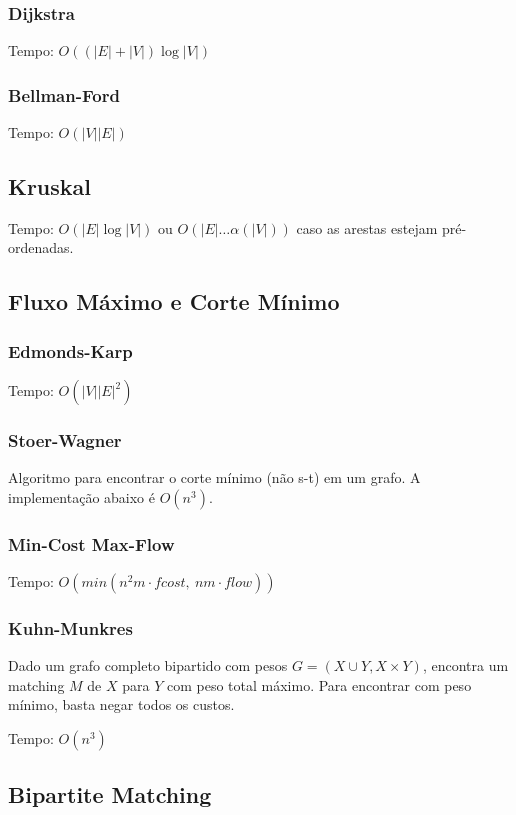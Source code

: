 \documentclass[12pt,a4paper]{article}
\begin{document}
			\subsubsection{Dijkstra}
				Tempo: \( O((|E| + |V|) \log |V|) \)
				
			\subsubsection{Bellman-Ford}
				Tempo: \( O(|V| |E|) \)
				
		\subsection{Kruskal}
			Tempo: \( O(|E| \log |V|) \) ou \( O(|E| \ldots \alpha(|V|)) \) caso as arestas estejam pré-ordenadas.
			
		\subsection{Fluxo Máximo e Corte Mínimo}
			\subsubsection{Edmonds-Karp}
				Tempo: \( O(|V| |E|^2) \)
				
			\subsubsection{Stoer-Wagner}
				Algoritmo para encontrar o corte mínimo (não s-t) em um grafo. A implementação abaixo é \(O(n^3)\).
				
			\subsubsection{Min-Cost Max-Flow}
				Tempo: \( O(min(n^2 m \cdot fcost, ~ n m \cdot flow) ) \)
				
			\subsubsection{Kuhn-Munkres}
				Dado um grafo completo bipartido com pesos $ G = (X \cup Y, X \times Y) $, encontra um matching $M$ de $X$ para $Y$ com peso total máximo. Para encontrar com peso mínimo, basta negar todos os custos.

				Tempo: \( O(n^3) \)
				
		\subsection{Bipartite Matching}
\end{document}
